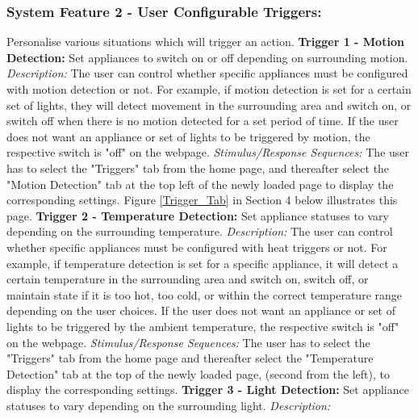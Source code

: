 \documentclass[10pt,twocolumn]{witseiepaper}
\begin{document}
	\subsubsection{System Feature 2 - User Configurable Triggers:} 
	Personalise various situations which will trigger an action.
	\newline
	\textbf{Trigger 1 - Motion Detection:}
	Set appliances to switch on or off depending on surrounding motion. 
	\newline
	\textit{Description:}
	The user can control whether specific appliances must be configured with motion detection or not. For example, if motion detection is set for a certain set of lights, they will detect movement in the surrounding area and switch on, or switch off when there is no motion detected for a set period of time. If the user does not want an appliance or set of lights to be triggered by motion, the respective switch is "off" on the webpage. 
	\newline
	\textit{Stimulus/Response Sequences:}	
	The user has to select the "Triggers" tab from the home page, and thereafter select the "Motion Detection" tab at the top left of the newly loaded page to display the corresponding settings. Figure \ref{Trigger_Tab} in Section 4 below illustrates this page. 
	\newline
	\textbf{Trigger 2 - Temperature Detection:}
	Set appliance statuses to vary depending on the surrounding temperature.
	\newline
	\textit{Description:}
	The user can control whether specific appliances must be configured with heat triggers or not. For example, if temperature detection is set for a specific appliance, it will detect a certain temperature in the surrounding area and switch on, switch off, or maintain state if it is too hot, too cold, or within the correct temperature range depending on the user choices. If the user does not want an appliance or set of lights to be triggered by the ambient temperature, the respective switch is "off" on the webpage. 
	\newline
	\textit{Stimulus/Response Sequences:}	
	The user has to select the "Triggers" tab from the home page and thereafter select the "Temperature Detection" tab at the top of the newly loaded page, (second from the left), to display the corresponding settings.
	\newline
	\textbf{Trigger 3 - Light Detection:}
	Set appliance statuses to vary depending on the surrounding light.
	\newline
	\textit{Description:}
\end{document}
